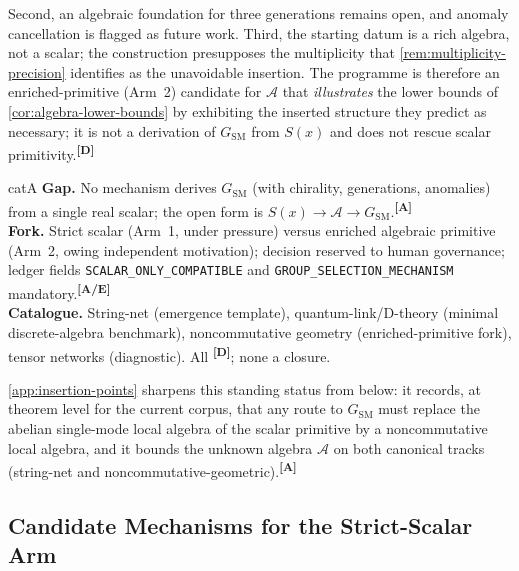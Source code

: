 \documentclass[12pt,a4paper,twoside]{article}
\theoremstyle{plain}
\theoremstyle{definition}
\theoremstyle{remark}
\newcommand{\catmark}[1]{\textsuperscript{\textsf{\textbf{[#1]}}}}
\begin{document}
\begin{description}[leftmargin=1.4em,style=nextline]
Second, an algebraic foundation for three generations remains open, and anomaly cancellation is flagged as future work. Third, the starting datum is a rich algebra, not a scalar; the construction presupposes the multiplicity that \cref{rem:multiplicity-precision} identifies as the unavoidable insertion. The programme is therefore an enriched-primitive (Arm~2) candidate for $\mathcal{A}$ that \emph{illustrates} the lower bounds of \cref{cor:algebra-lower-bounds} by exhibiting the inserted structure they predict as necessary; it is not a derivation of $G_{\mathrm{SM}}$ from $S(x)$ and does not rescue scalar primitivity.\catmark{D}
\end{description}

\begin{evidencebox}{catA}
\textbf{Gap.} No mechanism derives $G_{\mathrm{SM}}$ (with chirality, generations, anomalies) from a single real scalar; the open form is
$S(x)\to\mathcal{A}\to G_{\mathrm{SM}}$.\catmark{A}\\[0.3em]
\textbf{Fork.} Strict scalar (Arm~1, under pressure) versus enriched algebraic primitive (Arm~2, owing independent motivation); decision reserved to human governance; ledger fields \texttt{SCALAR\_ONLY\_COMPATIBLE} and
\texttt{GROUP\_SELECTION\_MECHANISM} mandatory.\catmark{A/E}\\[0.3em]
\textbf{Catalogue.} String-net (emergence template), quantum-link/D-theory (minimal discrete-algebra benchmark), noncommutative geometry (enriched-primitive fork), tensor networks (diagnostic). All \catmark{D}; none a closure.
\end{evidencebox}

\noindent \cref{app:insertion-points} sharpens this standing status from below: it records, at theorem level for the current corpus, that any route to $G_{\mathrm{SM}}$ must replace the abelian single-mode local algebra of the scalar primitive by a noncommutative local algebra, and it bounds the unknown algebra $\mathcal{A}$ on both canonical tracks (string-net and noncommutative-geometric).\catmark{A}

\subsection{Candidate Mechanisms for the Strict-Scalar Arm}
\label{subsec:arm1-mechanisms}
\end{document}
